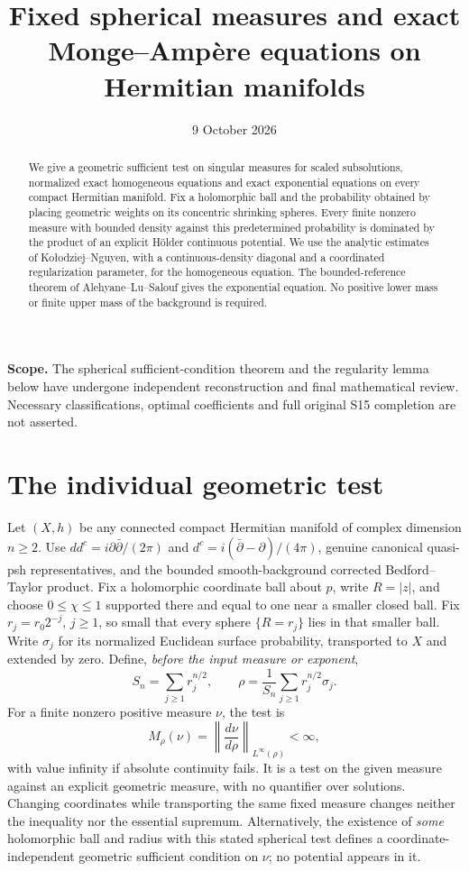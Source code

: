 \documentclass[11pt]{article}
\title{Fixed spherical measures and exact Monge--Amp\`ere\newline
equations on Hermitian manifolds}
\author{}\date{9 October 2026}
\newcommand{\ddc}{dd^c}
\begin{document}
\maketitle
\noindent\textbf{Scope.} The spherical sufficient-condition theorem and
the regularity lemma below have undergone independent reconstruction and
final mathematical review. Necessary classifications, optimal coefficients
and full original S15 completion are not asserted.
\begin{abstract}
We give a geometric sufficient test on singular measures for scaled
subsolutions, normalized exact homogeneous equations and exact exponential
equations on every compact Hermitian manifold. Fix a holomorphic ball and
the probability obtained by placing geometric weights on its concentric
shrinking spheres. Every finite nonzero measure with bounded density
against this predetermined probability is dominated by the product of an
explicit H\"older continuous potential. We use the analytic estimates of
Ko\l odziej--Nguyen, with a continuous-density diagonal and a coordinated
regularization parameter, for the homogeneous equation. The bounded-reference
theorem of Alehyane--Lu--Salouf gives the exponential equation. No positive
lower mass or finite upper mass of the background is required.
\end{abstract}

\section{The individual geometric test}
Let $(X,h)$ be any connected compact Hermitian manifold of complex
dimension $n\geq2$. Use $\ddc=i\partial\bar\partial/(2\pi)$ and
$d^c=i(\bar\partial-\partial)/(4\pi)$, genuine canonical
quasi-psh representatives, and the bounded smooth-background corrected
Bedford--Taylor product. Fix a holomorphic coordinate ball about $p$,
write $R=|z|$, and choose $0\leq\chi\leq1$ supported there and equal
to one near a smaller closed ball. Fix $r_j=r_0 2^{-j}$, $j\geq1$,
so small that every sphere $\{R=r_j\}$ lies in that smaller ball.
Write $\sigma_j$ for its normalized Euclidean surface probability,
transported to $X$ and extended by zero. Define, \emph{before the input
measure or exponent},
\[
 S_n=\sum_{j\geq1}r_j^{n/2},\qquad
 \rho=\frac1{S_n}\sum_{j\geq1}r_j^{n/2}\sigma_j.
\]
For a finite nonzero positive measure $\nu$, the test is
\[
 M_\rho(\nu)=\left\|\frac{d\nu}{d\rho}\right\|_{L^\infty(\rho)}<\infty,
\]
with value infinity if absolute continuity fails. It is a test on the
given measure against an explicit geometric measure, with no quantifier
over solutions. Changing coordinates while transporting the same fixed
measure changes neither the inequality nor the essential supremum.
Alternatively, the existence of \emph{some} holomorphic ball and radius
with this stated spherical test defines a coordinate-independent
geometric sufficient condition on $\nu$; no potential appears in it.
\end{document}
